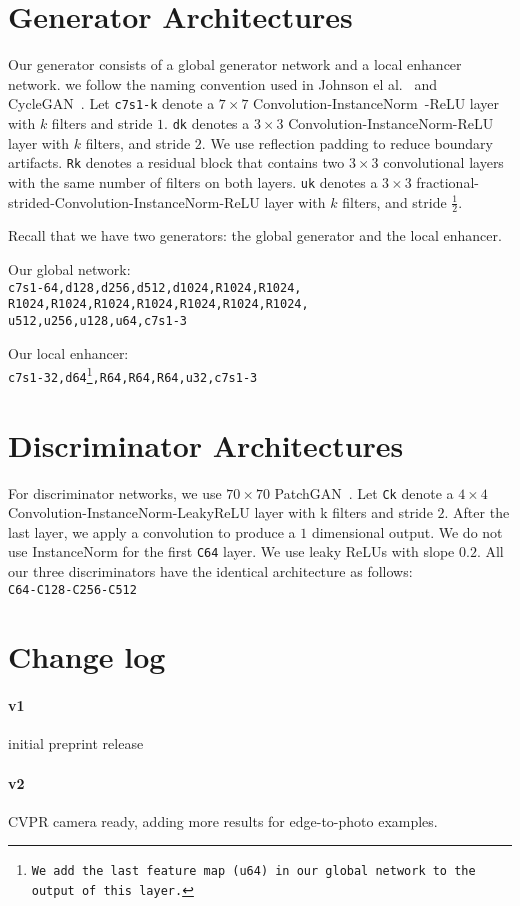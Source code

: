 \documentclass[10pt,twocolumn,letterpaper]{article}
\begin{document}
\section{Generator Architectures}
Our generator consists of a global generator network and a local enhancer network. we follow the naming convention used in Johnson el al.~\cite{johnson2016perceptual} and CycleGAN~\cite{zhu2017unpaired}. Let \texttt{c7s1-k} denote a $7\times7$ Convolution-InstanceNorm~\cite{ulyanov2016instance}-ReLU layer with $k$ filters and stride $1$. \texttt{dk} denotes a $3\times3$ Convolution-InstanceNorm-ReLU layer with $k$ filters, and stride $2$. We use reflection padding  to reduce boundary artifacts. \texttt{Rk} denotes a residual block that contains two $3\times3$ convolutional layers with the same number of filters on both layers. \texttt{uk} denotes a $3\times3$ fractional-strided-Convolution-InstanceNorm-ReLU layer with $k$ filters, and stride $\frac{1}{2}$.

Recall that we have two generators: the global generator and the local enhancer.  

Our global network:\\
\texttt{c7s1-64,d128,d256,d512,d1024,R1024,R1024,\\
R1024,R1024,R1024,R1024,R1024,R1024,R1024,\\
u512,u256,u128,u64,c7s1-3}

Our local enhancer:\\
\texttt{c7s1-32,d64\footnote{We add the last feature map (\texttt{u64}) in our global network to the output of this layer.},R64,R64,R64,u32,c7s1-3}

\section{Discriminator Architectures}
For discriminator networks, we use $70\times 70$ PatchGAN~\cite{isola2016image}. 
Let \texttt{Ck} denote a $4\times4$ Convolution-InstanceNorm-LeakyReLU layer with k filters and stride $2$. After the last layer, we apply a convolution to produce a $1$ dimensional output. We do not use InstanceNorm for the first \texttt{C64} layer. We use leaky ReLUs with slope $0.2$. All our three discriminators have the identical architecture as follows:\\

\texttt{C64-C128-C256-C512}

\section{Change log}
\paragraph{v1} initial preprint release
\paragraph{v2} CVPR camera ready, adding more results for edge-to-photo examples. 
\end{document}
